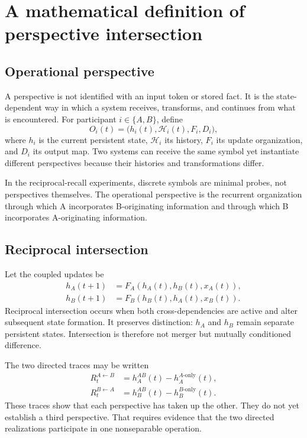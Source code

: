 \documentclass[11pt,a4paper]{article}
\begin{document}
\section{A mathematical definition of perspective intersection}

\subsection{Operational perspective}

A perspective is not identified with an input token or stored fact. It is the state-dependent way in which a system receives, transforms, and continues from what is encountered. For participant $i\in\{A,B\}$, define
\begin{equation}
 O_i(t)=\bigl(h_i(t),\mathcal H_i(t),F_i,D_i\bigr),
 \label{eq:perspective}
\end{equation}
where $h_i$ is the current persistent state, $\mathcal H_i$ its history, $F_i$ its update organization, and $D_i$ its output map. Two systems can receive the same symbol yet instantiate different perspectives because their histories and transformations differ.

In the reciprocal-recall experiments, discrete symbols are minimal probes, not perspectives themselves. The operational perspective is the recurrent organization through which A incorporates B-originating information and through which B incorporates A-originating information.

\subsection{Reciprocal intersection}

Let the coupled updates be
\begin{align}
 h_A(t+1)&=F_A(h_A(t),h_B(t),x_A(t)),\\
 h_B(t+1)&=F_B(h_B(t),h_A(t),x_B(t)).
 \label{eq:coupled}
\end{align}
Reciprocal intersection occurs when both cross-dependencies are active and alter subsequent state formation. It preserves distinction: $h_A$ and $h_B$ remain separate persistent states. Intersection is therefore not merger but mutually conditioned difference.

The two directed traces may be written
\begin{align}
 R_t^{A\leftarrow B}&=h_A^{AB}(t)-h_A^{A\text{-only}}(t),\\
 R_t^{B\leftarrow A}&=h_B^{AB}(t)-h_B^{B\text{-only}}(t).
 \label{eq:directed}
\end{align}
These traces show that each perspective has taken up the other. They do not yet establish a third perspective. That requires evidence that the two directed realizations participate in one nonseparable operation.
\end{document}
